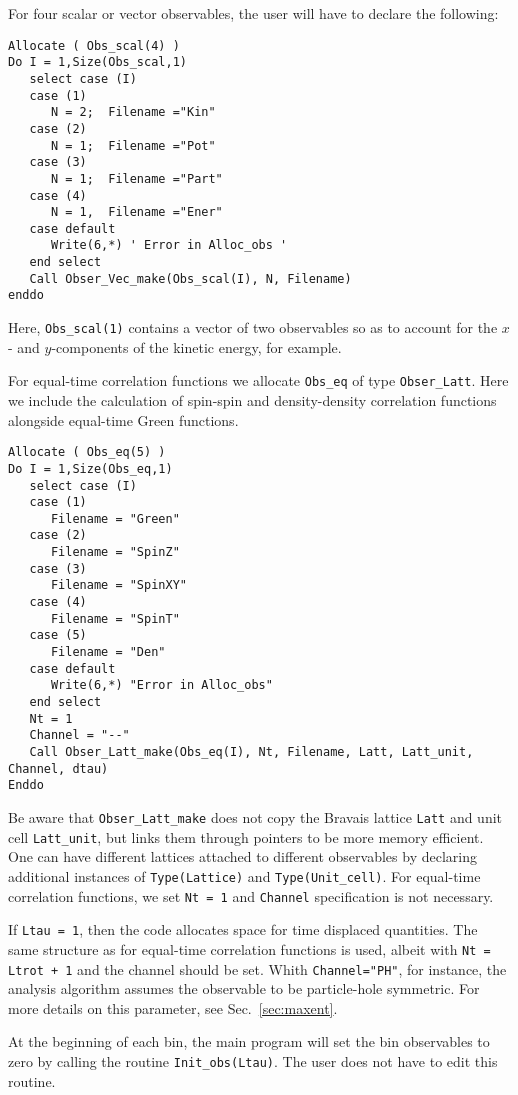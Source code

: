 For  four scalar  or vector observables,  the user will have to  declare the following: 
\begin{lstlisting}[style=fortran]
Allocate ( Obs_scal(4) )
Do I = 1,Size(Obs_scal,1)
   select case (I)
   case (1)
      N = 2;  Filename ="Kin"
   case (2)
      N = 1;  Filename ="Pot"
   case (3)
      N = 1;  Filename ="Part"
   case (4)
      N = 1,  Filename ="Ener"
   case default
      Write(6,*) ' Error in Alloc_obs '  
   end select
   Call Obser_Vec_make(Obs_scal(I), N, Filename)
enddo
\end{lstlisting}
Here,   \texttt{Obs\_scal(1)}   contains a vector  of two observables  so as to account for the $x$- and $y$-components of the kinetic energy, for example.  

For equal-time correlation functions  we allocate  \texttt{Obs\_eq}  of type \texttt{Obser\_Latt}.  Here we include the calculation of spin-spin and density-density correlation functions alongside equal-time Green functions. 
\begin{lstlisting}[style=fortran]
Allocate ( Obs_eq(5) )
Do I = 1,Size(Obs_eq,1)
   select case (I)
   case (1)
      Filename = "Green"
   case (2)
      Filename = "SpinZ"
   case (3)
      Filename = "SpinXY"
   case (4)
      Filename = "SpinT"
   case (5)
      Filename = "Den"
   case default
      Write(6,*) "Error in Alloc_obs"
   end select
   Nt = 1
   Channel = "--"
   Call Obser_Latt_make(Obs_eq(I), Nt, Filename, Latt, Latt_unit, Channel, dtau)
Enddo
\end{lstlisting} 
Be aware that \texttt{Obser\_Latt\_make} does not copy the Bravais lattice \texttt{Latt} 
and unit cell \texttt{Latt\_unit}, but links them through pointers to be more memory 
efficient. One can have different lattices attached to different observables by declaring 
additional instances of \texttt{Type(Lattice)} and \texttt{Type(Unit\_cell)}.
 For equal-time correlation functions, we set \texttt{Nt = 1} and \texttt{Channel} specification is not necessary.

If \texttt{Ltau = 1}, then the code allocates space for time displaced quantities. The 
same structure as for equal-time correlation functions is used, albeit with 
\texttt{Nt = Ltrot + 1} and the channel should be set. Whith \texttt{Channel="PH"}, for instance, the analysis algorithm assumes the observable to be particle-hole symmetric. For more details on this parameter, see Sec.~\ref{sec:maxent}.

At the beginning of each bin, the main program will set the bin observables to zero by calling  the routine \texttt{Init\_obs(Ltau)}. The user does not have to edit this routine. 
 
